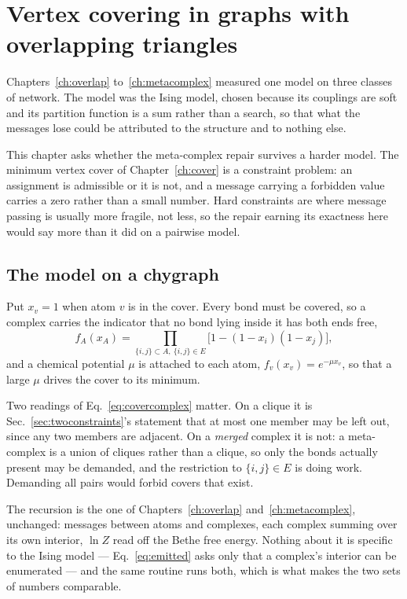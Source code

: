 \chapter{Vertex covering in graphs with overlapping triangles}
\label{ch:covertriangles}

Chapters~\ref{ch:overlap} to~\ref{ch:metacomplex} measured one model on three
classes of network. The model was the Ising model, chosen because its couplings
are soft and its partition function is a sum rather than a search, so that what
the messages lose could be attributed to the structure and to nothing else.

This chapter asks whether the meta-complex repair survives a harder model. The
minimum vertex cover of Chapter~\ref{ch:cover} is a constraint problem: an
assignment is admissible or it is not, and a message carrying a forbidden value
carries a zero rather than a small number. Hard constraints are where message
passing is usually more fragile, not less, so the repair earning its exactness
here would say more than it did on a pairwise model.

\section{The model on a chygraph}
\label{sec:covermodel}

Put $x_{v}=1$ when atom $v$ is in the cover. Every bond must be covered, so a
complex carries the indicator that no bond lying inside it has both ends free,
\begin{equation}
  f_{A}(x_{A})=\prod_{\{i,j\}\subset A,\ \{i,j\}\in E}
    \bigl[1-(1-x_{i})(1-x_{j})\bigr],
  \label{eq:covercomplex}
\end{equation}
and a chemical potential $\mu$ is attached to each atom, $f_{v}(x_{v})
=e^{-\mu x_{v}}$, so that a large $\mu$ drives the cover to its minimum.

Two readings of Eq.~\eqref{eq:covercomplex} matter. On a clique it is
Sec.~\ref{sec:twoconstraints}'s statement that at most one member may be left
out, since any two members are adjacent. On a \emph{merged} complex it is not:
a meta-complex is a union of cliques rather than a clique, so only the bonds
actually present may be demanded, and the restriction to $\{i,j\}\in E$ is doing
work. Demanding all pairs would forbid covers that exist.

The recursion is the one of Chapters~\ref{ch:overlap} and~\ref{ch:metacomplex},
unchanged: messages between atoms and complexes, each complex summing over its
own interior, $\ln Z$ read off the Bethe free energy. Nothing about it is
specific to the Ising model --- Eq.~\eqref{eq:emitted} asks only that a
complex's interior can be enumerated --- and the same routine runs both, which
is what makes the two sets of numbers comparable.

